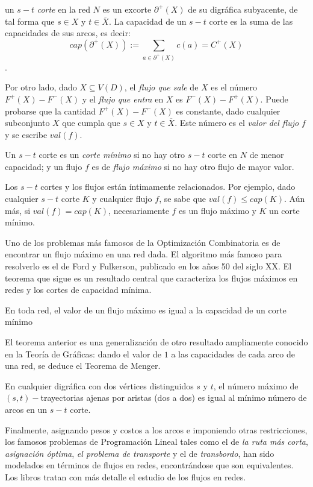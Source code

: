 un $s-t$ \textit{corte} en la red $N$ es un excorte $\partial^{+}(X)$ de su digráfica subyacente, de tal forma que $s \in X$ y $t\in \overline{X}$. La capacidad de un $s-t$ corte es la suma de las capacidades de sus arcos, es decir:$$cap(\partial^{+}(X)):=\sum_{a \in \partial^{+}(X)}c(a) = C^{+}(X)$$.

Por otro lado, dado $X\subseteq V(D)$, el \textit{flujo que sale} de $X$ es el número $F^{+}(X)- F^{-}(X)$ y el \textit{flujo que entra} en $X$ es $F^{-}(X)- F^{+}(X)$. Puede probarse que la cantidad  $F^{+}(X)- F^{-}(X)$ es constante, dado cualquier subconjunto $X$ que cumpla que $s \in X$ y $t\in \overline{X}$. Este número es el \textit{valor del flujo $f$} y se escribe $val(f)$.

Un $s -t$ corte es un \textit{corte mínimo} si no hay otro $s-t$ corte en $N$ de menor capacidad; y un flujo $f$ es de \textit{flujo máximo} si no hay otro flujo de mayor valor. 

Los $s -t$ cortes y los flujos están íntimamente relacionados. Por ejemplo, dado cualquier $s-t$ corte $K$ y cualquier flujo $f$, se sabe que $val(f) \leq cap(K)$. Aún más, si $val(f) = cap(K)$, necesariamente $f$ es un flujo máximo y $K$ un corte  mínimo.

Uno de los problemas más famosos de la Optimización Combinatoria es de encontrar un flujo máximo en una red dada. El algoritmo más famoso para resolverlo es el de Ford y Fulkerson, publicado en los años 50 del siglo XX. El teorema que sigue es un resultado central que caracteriza los flujos máximos en redes y los cortes de capacidad mínima.

\begin{teo}
En toda red, el valor de un flujo máximo es igual a la capacidad de un corte mínimo
\end{teo}

El teorema anterior es una generalización de otro resultado ampliamente conocido en la Teoría de Gráficas: dando el valor de $1$ a las capacidades de cada arco de una red, se deduce el Teorema de Menger.

\begin{teo}
En cualquier digráfica con dos vértices distinguidos $s$ y $t$, el número máximo de $(s,t)-$trayectorias ajenas por aristas (dos a dos) es igual al mínimo número de arcos en un $s-t$ corte.
\end{teo}

Finalmente, asignando pesos y costos a los arcos e imponiendo otras restricciones, los famosos problemas de Programación Lineal tales como el de \textit{la ruta más corta}, \textit{asignación óptima}, \textit{el problema de transporte} y el de \textit{transbordo}, han sido modelados en términos de flujos en redes, encontrándose que son equivalentes. Los libros \cite{FordFulkerosns, Chen, Chen2, Bondy, Korte} tratan con más detalle el estudio de los flujos en redes.

